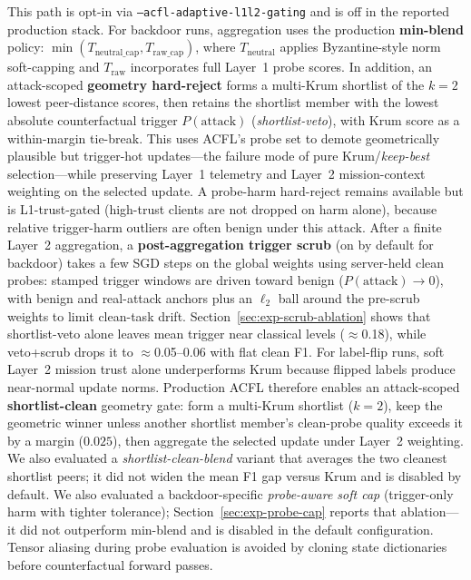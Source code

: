 This path is opt-in via \texttt{--acfl-adaptive-l1l2-gating} and is off in the reported production stack.
For backdoor runs, aggregation uses the production \textbf{min-blend} policy: $\min(T_{\mathrm{neutral\_cap}}, T_{\mathrm{raw\_cap}})$, where $T_{\mathrm{neutral}}$ applies Byzantine-style norm soft-capping and $T_{\mathrm{raw}}$ incorporates full Layer~1 probe scores.
In addition, an attack-scoped \textbf{geometry hard-reject} forms a multi-Krum shortlist of the $k{=}2$ lowest peer-distance scores, then retains the shortlist member with the lowest absolute counterfactual trigger $P(\text{attack})$ (\emph{shortlist-veto}), with Krum score as a within-margin tie-break.
This uses ACFL's probe set to demote geometrically plausible but trigger-hot updates---the failure mode of pure Krum/\emph{keep-best} selection---while preserving Layer~1 telemetry and Layer~2 mission-context weighting on the selected update.
A probe-harm hard-reject remains available but is L1-trust-gated (high-trust clients are not dropped on harm alone), because relative trigger-harm outliers are often benign under this attack.
After a finite Layer~2 aggregation, a \textbf{post-aggregation trigger scrub} (on by default for backdoor) takes a few SGD steps on the global weights using server-held clean probes: stamped trigger windows are driven toward benign ($P(\text{attack}){\to}0$), with benign and real-attack anchors plus an $\ell_2$ ball around the pre-scrub weights to limit clean-task drift.
Section~\ref{sec:exp-scrub-ablation} shows that shortlist-veto alone leaves mean trigger near classical levels ($\approx$0.18), while veto+scrub drops it to $\approx$0.05--$0.06$ with flat clean F1.
For label-flip runs, soft Layer~2 mission trust alone underperforms Krum because flipped labels produce near-normal update norms.
Production ACFL therefore enables an attack-scoped \textbf{shortlist-clean} geometry gate: form a multi-Krum shortlist ($k{=}2$), keep the geometric winner unless another shortlist member's clean-probe quality exceeds it by a margin ($0.025$), then aggregate the selected update under Layer~2 weighting.
We also evaluated a \emph{shortlist-clean-blend} variant that averages the two cleanest shortlist peers; it did not widen the mean F1 gap versus Krum and is disabled by default.
We also evaluated a backdoor-specific \emph{probe-aware soft cap} (trigger-only harm with tighter tolerance); Section~\ref{sec:exp-probe-cap} reports that ablation---it did not outperform min-blend and is disabled in the default configuration.
Tensor aliasing during probe evaluation is avoided by cloning state dictionaries before counterfactual forward passes.

